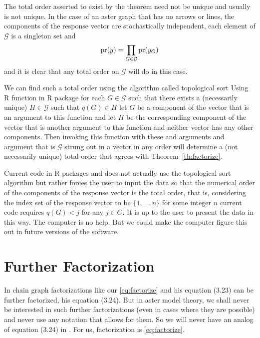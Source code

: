 The total order asserted to exist by the theorem need not be unique and
usually is not unique.  In the case of an aster graph that has no arrows
or lines, the components of the response vector are stochastically independent,
each element of $\mathcal{G}$ is a singleton set and
$$
   \operatorname{pr}(y) = \prod_{G \in \mathcal{G}} \operatorname{pr}(y_G)
$$
and it is clear that any total order on $\mathcal{G}$ will do in this case.

We can find such a total order using the algorithm called topological sort
\citep[Section~6.6]{aho-et-al} Using R function  in R package
\citep{pooh-package} for each $G \in \mathcal{G}$ such that there exists
a (necessarily unique) $H \in \mathcal{G}$ such that $q(G) \in H$
let $G$ be a component of the vector  that is an argument to this
function and
let $H$ be the corresponding component of the vector  that is another
argument to this function and
neither vector has any other components.  Then invoking this function with
these  and  arguments and  argument that is
$\mathcal{G}$ strung out in a vector in any order
will determine a (not necessarily unique) total order that agrees with
Theorem~\ref{th:factorize}.

Current code in R packages  and  does not
actually use the topological sort algorithm but rather forces the user
to input the data so that the numerical order of the components of the
response vector is the total order, that is, considering the index set
of the response vector to be $\{1, \ldots, n\}$ for some integer $n$
current code requires $q(G) < j$ for any $j \in G$.
It is up to the user to present the data in this way.  The computer is no help.
But we could make the computer figure this out in future versions of the
software.

\section{Further Factorization}

In \citet{lauritzen} chain graph factorizations like our \eqref{eq:factorize}
and his equation (3.23) can be further factorized, his equation (3.24).
But in aster model theory, we shall never be interested in such further
factorizations (even in cases where they are possible) and never use any
notation that allows for them.  So we will never have an analog of equation
(3.24) in \citet{lauritzen}.  For us, factorization is \eqref{eq:factorize}.

